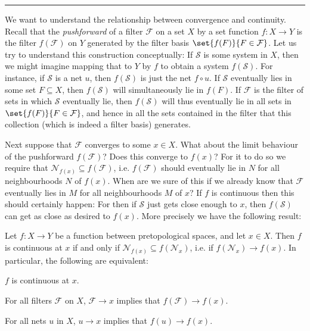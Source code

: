 \documentclass[article, a4paper, 11pt, oneside]{memoir}
\numberwithin{equation}{chapter}
\newcommand{\calF}{\mathcal{F}}
\newcommand{\calS}{\mathcal{S}}
\newcommand{\calN}{\mathcal{N}}
\newcommand{\nhoods}[1]{\calN_{#1}}
\newcommand\fleuronbreak{\fancybreak{\textcolor{linkcolor}{\adfhangingflatleafleft}}}
\begin{document}
\fleuronbreak

We want to understand the relationship between convergence and continuity. Recall that the \emph{pushforward} of a filter $\calF$ on a set $X$ by a set function $f \colon X \to Y$ is the filter $f(\calF)$ on $Y$ generated by the filter basis $\set{f(F)}{F \in \calF}$. Let us try to understand this construction conceptually: If $\calS$ is some system in $X$, then we might imagine mapping that to $Y$ by $f$ to obtain a system $f(\calS)$. For instance, if $\calS$ is a net $u$, then $f(\calS)$ is just the net $f \circ u$. If $\calS$ eventually lies in some set $F \subseteq X$, then $f(\calS)$ will simultaneously lie in $f(F)$. If $\calF$ is the filter of sets in which $\calS$ eventually lie, then $f(\calS)$ will thus eventually lie in all sets in $\set{f(F)}{F \in \calF}$, and hence in all the sets contained in the filter that this collection (which is indeed a filter basis) generates.

Next suppose that $\calF$ converges to some $x \in X$. What about the limit behaviour of the pushforward $f(\calF)$? Does this converge to $f(x)$? For it to do so we require that $\nhoods{f(x)} \subseteq f(\calF)$, i.e. $f(\calF)$ should eventually lie in $N$ for all neighbourhoods $N$ of $f(x)$. When are we sure of this if we already know that $\calF$ eventually lies in $M$ for all neighbourhoods $M$ of $x$? If $f$ is continuous then this should certainly happen: For then if $\calS$ just gets close enough to $x$, then $f(\calS)$ can get as close as desired to $f(x)$. More precisely we have the following result:

\begin{proposition}
    \label{thm:continuity-filter-net}
    Let $f \colon X \to Y$ be a function between pretopological spaces, and let $x \in X$. Then $f$ is continuous at $x$ if and only if $\nhoods{f(x)} \subseteq f(\nhoods{x})$, i.e. if $f(\nhoods{x}) \to f(x)$. In particular, the following are equivalent:
    \begin{enumprop}
        \item \label{enum:continuity-point} $f$ is continuous at $x$.
        \item \label{enum:filter-convergence-point} For all filters $\calF$ on $X$, $\calF \to x$ implies that $f(\calF) \to f(x)$.
        \item \label{enum:net-convergence-point} For all nets $u$ in $X$, $u \to x$ implies that $f(u) \to f(x)$.
    \end{enumprop}
\end{proposition}
\end{document}
